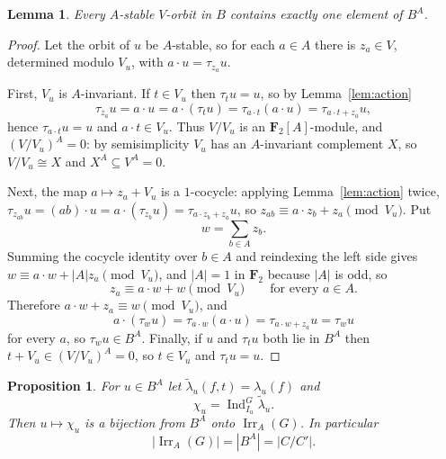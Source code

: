 \documentclass[11pt,a4paper,reqno]{amsart}
\newtheorem{proposition}[theorem]{Proposition}
\newtheorem{lemma}[theorem]{Lemma}
\theoremstyle{definition}
\theoremstyle{remark}
\newcommand{\F}{\mathbf F}
\newcommand{\Irr}{\operatorname{Irr}}
\newcommand{\Ind}{\operatorname{Ind}}
\begin{document}
\begin{lemma}\label{lem:fixed-representative}
Every $A$-stable $V$-orbit in $B$ contains exactly one element of
$B^A$.
\end{lemma}

\begin{proof}
Let the orbit of $u$ be $A$-stable, so for each $a\in A$ there is
$z_a\in V$, determined modulo $V_u$, with $a\cdot u=\tau_{z_a}u$.

First, $V_u$ is $A$-invariant.  If $t\in V_u$ then $\tau_tu=u$, so by
Lemma~\ref{lem:action}
\[
 \tau_{z_a}u=a\cdot u=a\cdot(\tau_tu)=\tau_{a\cdot t}(a\cdot u)
 =\tau_{a\cdot t+z_a}u ,
\]
hence $\tau_{a\cdot t}u=u$ and $a\cdot t\in V_u$.  Thus $V/V_u$ is an
$\F_2[A]$-module, and $(V/V_u)^A=0$: by semisimplicity $V_u$ has an
$A$-invariant complement $X$, so $V/V_u\cong X$ and
$X^A\subseteq V^A=0$.

Next, the map $a\mapsto z_a+V_u$ is a $1$-cocycle: applying
Lemma~\ref{lem:action} twice,
$\tau_{z_{ab}}u=(ab)\cdot u=a\cdot(\tau_{z_b}u)=\tau_{a\cdot z_b+z_a}u$,
so $z_{ab}\equiv a\cdot z_b+z_a \pmod{V_u}$.  Put
\[
 w=\sum_{b\in A}z_b .
\]
Summing the cocycle identity over $b\in A$ and reindexing the left side
gives $w\equiv a\cdot w+|A|z_a\pmod{V_u}$, and $|A|=1$ in $\F_2$ because
$|A|$ is odd, so
\[
 z_a\equiv a\cdot w+w\pmod{V_u}\qquad\text{for every }a\in A .
\]
Therefore $a\cdot w+z_a\equiv w\pmod{V_u}$, and
\[
 a\cdot(\tau_wu)=\tau_{a\cdot w}(a\cdot u)=\tau_{a\cdot w+z_a}u=\tau_wu
\]
for every $a$, so $\tau_wu\in B^A$.  Finally, if $u$ and $\tau_tu$ both
lie in $B^A$ then $t+V_u\in(V/V_u)^A=0$, so $t\in V_u$ and
$\tau_tu=u$.
\end{proof}

\begin{proposition}\label{prop:invariant-irr}
For $u\in B^A$ let $\widetilde\lambda_u(f,t)=\lambda_u(f)$ and
\[
 \chi_u=\Ind_{I_u}^G\widetilde\lambda_u .
\]
Then $u\mapsto\chi_u$ is a bijection from $B^A$ onto $\Irr_A(G)$.  In
particular
\[
 |\Irr_A(G)|=|B^A|=|C/C'| .
\]
\end{proposition}
\end{document}

